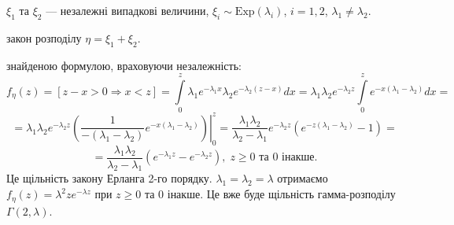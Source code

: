 \begin{example}
    $\xi_1$ та $\xi_2$ --- незалежні випадкові величини, $\xi_i \sim \mathrm{Exp}(\lambda_i)$, 
    $i = 1,2$, $\lambda_1 \neq \lambda_2$.

     закон розподілу $\eta = \xi_1 + \xi_2$.

     знайденою формулою, враховуючи незалежність:
    \begin{equation*}
        f_\eta(z) = \left[z - x > 0 \Rightarrow x < z\right] = 
        \int\limits_0^z \lambda_1 e^{-\lambda_1 x}\lambda_2e^{-\lambda_2(z-x)}dx
        =
        \lambda_1\lambda_2e^{-\lambda_2z}\int\limits_0^z e^{-x(\lambda_1 - \lambda_2)} dx=
    \end{equation*}
    \begin{equation*}
        =\lambda_1\lambda_2e^{-\lambda_2z}
        \left.
        \left(\frac{1}{-(\lambda_1 - \lambda_2)} e^{-x(\lambda_1 - \lambda_2)}\right)
        \right|_0^z = 
        \frac{\lambda_1\lambda_2}{\lambda_2 - \lambda_1}e^{-\lambda_2z}
        (e^{-z(\lambda_1 - \lambda_2)} - 1) =
    \end{equation*}
    \begin{equation*}
        = \frac{\lambda_1\lambda_2}{\lambda_2 - \lambda_1}(e^{-\lambda_1 z} - e^{-\lambda_2 z})
        ,\; z \geq 0 \text{ та } 0 \text{ інакше.}
    \end{equation*}
Це щільність закону Ерланга 2-го порядку.
 $\lambda_1 = \lambda_2 = \lambda$ отримаємо
$f_{\eta}(z) = \lambda^2 z e^{-\lambda z}$ при $z \geq 0$ та $0$ інакше.
Це вже буде щільність гамма-розподілу $\Gamma(2, \lambda)$.
\end{example}
